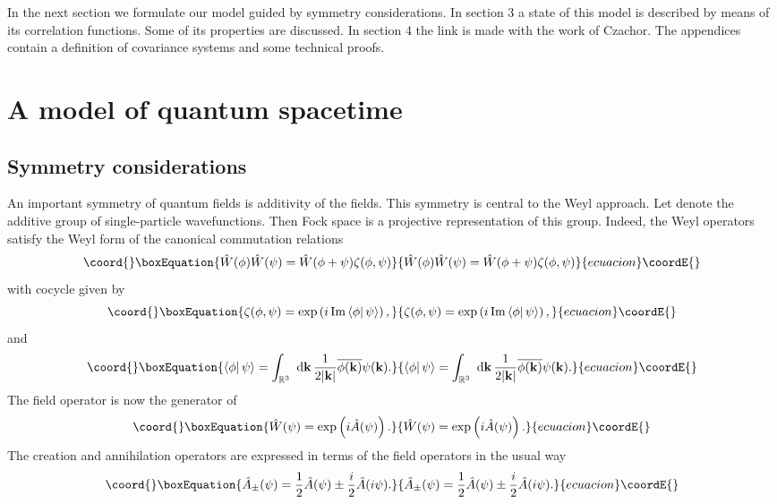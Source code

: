 \documentclass[12pt,a4paper]{article}
\def\Ro{{\mathbb R}}
\def\kk{{\bf k}}
\renewcommand{\Im}{\,{\rm Im}\,}
\begin{document}
In the next section we formulate our model guided
by symmetry considerations. In section 3 a state of this model
is described by means of its correlation functions.
Some of its properties are discussed.
In section 4 the link is made with the work of Czachor.
The appendices contain a definition of covariance systems
and some technical proofs.

\section{A model of quantum spacetime}

\subsection{Symmetry considerations}

An important symmetry of quantum fields is additivity of the fields.
This symmetry is central to the Weyl approach. Let \coordHE{}
denote the additive group of single-particle wavefunctions.
Then Fock space is a projective representation of this group.
Indeed, the Weyl operators \coordHE{} satisfy the Weyl
form of the canonical commutation relations
\begin{equation}\coord{}\boxEquation{
\hat W(\phi)\hat W(\psi)=\hat W(\phi+\psi)\zeta(\phi,\psi)
\label{Weylccr}
}{
\hat W(\phi)\hat W(\psi)=\hat W(\phi+\psi)\zeta(\phi,\psi)
}{ecuacion}\coordE{}\end{equation}
with cocycle \myHighlight{$\zeta$}\coordHE{} given by
\begin{equation}\coord{}\boxEquation{
\zeta(\phi,\psi)=\exp\left(i\Im\langle\phi|\,\psi\rangle\right),
}{
\zeta(\phi,\psi)=\exp\left(i\Im\langle\phi|\,\psi\rangle\right),
}{ecuacion}\coordE{}\end{equation}
and
\begin{equation}\coord{}\boxEquation{
\langle\phi|\,\psi\rangle=\int_{\Ro^3}\hbox{ d}\kk\,\frac{1}{2|\kk|}
\overline{\phi(\kk)}\psi(\kk).
}{
\langle\phi|\,\psi\rangle=\int_{\Ro^3}\hbox{ d}\kk\,\frac{1}{2|\kk|}
\overline{\phi(\kk)}\psi(\kk).
}{ecuacion}\coordE{}\end{equation}
The field operator \coordHE{} is now the generator of \coordHE{}
\begin{equation}\coord{}\boxEquation{
\hat W(\psi)=\exp\left(i\hat A(\psi)\right).
\label{fieldopdef}
}{
\hat W(\psi)=\exp\left(i\hat A(\psi)\right).
}{ecuacion}\coordE{}\end{equation}
The creation and annihilation operators are expressed in terms
of the field operators in the usual way
\begin{equation}\coord{}\boxEquation{
\hat A_\pm(\psi)=\frac{1}{2}\hat A(\psi)\pm\frac{i}{2}\hat A(i\psi).
\label{creandef}
}{
\hat A_\pm(\psi)=\frac{1}{2}\hat A(\psi)\pm\frac{i}{2}\hat A(i\psi).
}{ecuacion}\coordE{}\end{equation}
\end{document}
